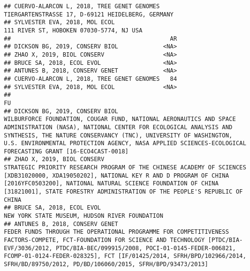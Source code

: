 \documentclass[]{article}
\begin{document}
\begin{verbatim}
## CUERVO-ALARCON L, 2018, TREE GENET GENOMES                       TIERGARTENSTRASSE 17, D-69121 HEIDELBERG, GERMANY
## SYLVESTER EVA, 2018, MOL ECOL                                             111 RIVER ST, HOBOKEN 07030-5774, NJ USA
##                                              AR
## DICKSON BG, 2019, CONSERV BIOL             <NA>
## ZHAO X, 2019, BIOL CONSERV                 <NA>
## BRUCE SA, 2018, ECOL EVOL                  <NA>
## ANTUNES B, 2018, CONSERV GENET             <NA>
## CUERVO-ALARCON L, 2018, TREE GENET GENOMES   84
## SYLVESTER EVA, 2018, MOL ECOL              <NA>
##                                                                                                                                                                                                                                                                                                                                                                                                                                                                              FU
## DICKSON BG, 2019, CONSERV BIOL                                                                                                                            WILBURFORCE FOUNDATION, COUGAR FUND, NATIONAL AERONAUTICS AND SPACE ADMINISTRATION (NASA), NATIONAL CENTER FOR ECOLOGICAL ANALYSIS AND SYNTHESIS, THE NATURE CONSERVANCY (TNC), UNIVERSITY OF WASHINGTON, U.S. ENVIRONMENTAL PROTECTION AGENCY, NASA APPLIED SCIENCES-ECOLOGICAL FORECASTING GRANT [16-ECO4CAST-0018]
## ZHAO X, 2019, BIOL CONSERV                                                                                                                                                                  STRATEGIC PRIORITY RESEARCH PROGRAM OF THE CHINESE ACADEMY OF SCIENCES [XDB31020000, XDA19050202], NATIONAL KEY R AND D PROGRAM OF CHINA [2016YFC0503200], NATIONAL NATURAL SCIENCE FOUNDATION OF CHINA [31821001], STATE FORESTRY ADMINISTRATION OF THE PEOPLE'S REPUBLIC OF CHINA
## BRUCE SA, 2018, ECOL EVOL                                                                                                                                                                                                                                                                                                                                                                                                        NEW YORK STATE MUSEUM, HUDSON RIVER FOUNDATION
## ANTUNES B, 2018, CONSERV GENET                                                                                                    FEDER FUNDS THROUGH THE OPERATIONAL PROGRAMME FOR COMPETITIVENESS FACTORS-COMPETE, FCT-FOUNDATION FOR SCIENCE AND TECHNOLOGY [PTDC/BIA-EVF/3036/2012, PTDC/BIA-BEC/099915/2008, POCI-01-0145-FEDER-006821, FCOMP-01-0124-FEDER-028325], FCT [IF/01425/2014, SFRH/BPD/102966/2014, SFRH/BD/89750/2012, PD/BD/106060/2015, SFRH/BPD/93473/2013]

\end{verbatim}
\end{document}
